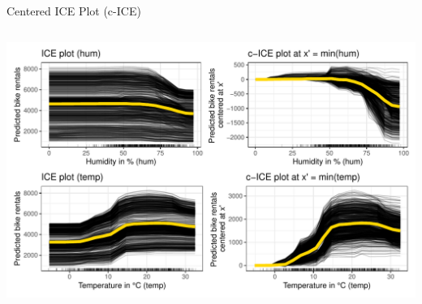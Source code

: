 \documentclass[11pt,compress,t,notes=noshow, aspectratio=169, xcolor=table]{beamer}
\begin{document}
\begin{frame}{Centered ICE Plot (c-ICE) }
\begin{columns}[c, totalwidth=\textwidth]
\begin{column}{0.55\textwidth}
\begin{center}
\includegraphics[width=\textwidth]{figure/cICE}
\end{center}
\end{column}
\end{columns}


\end{frame}
\end{document}
